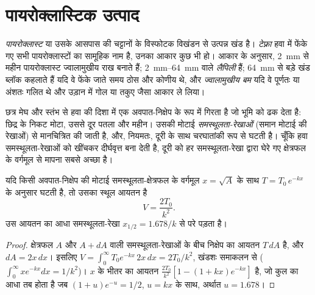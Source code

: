 \section{पायरोक्लास्टिक उत्पाद}

\begin{definition}[टेफ़्रा और पायरोक्लास्ट]\label{def:b2:eruptive-styles:tephra}
\emph{पायरोक्लास्ट}  या उसके आसपास की चट्टानों के विस्फोटक
विखंडन से उत्पन्न खंड है। \emph{टेफ़्रा} हवा में फेंके गए
सभी पायरोक्लास्टों का सामूहिक नाम है, उनका आकार कुछ भी हो।
आकार के अनुसार, \qty{2}{mm} से महीन पायरोक्लास्ट ज्वालामुखीय राख बनाते हैं;
\qtyrange{2}{64}{mm} वाले \emph{लैपिली} हैं;
\qty{64}{mm} से बड़े खंड ब्लॉक कहलाते हैं यदि वे फेंके जाते समय ठोस और कोणीय थे, और
\emph{ज्वालामुखीय बम} यदि वे पूर्णतः या अंशतः गलित थे
और उड़ान में गोल या तकुए जैसा आकार ले लिया।
\end{definition}

 छत्र मेघ और स्तंभ से हवा की दिशा में एक अवपात-निक्षेप के रूप में गिरता है
जो भूमि को ढक देता है: छिद्र के निकट मोटा, उससे दूर पतला और महीन। उसकी
मोटाई \emph{समस्थूलता-रेखाओं} (समान मोटाई की रेखाओं) से मानचित्रित की जाती है, और, नियमतः,
दूरी के साथ चरघातांकी रूप से घटती है। चूँकि हवा समस्थूलता-रेखाओं को खींचकर
दीर्घवृत्त बना देती है, दूरी को हर समस्थूलता-रेखा द्वारा घेरे गए क्षेत्रफल के वर्गमूल से
मापना सबसे अच्छा है।

\begin{proposition}\label{prop:b2:eruptive-styles:thinning}
यदि किसी अवपात-निक्षेप की मोटाई समस्थूलता-क्षेत्रफल के वर्गमूल $x = \sqrt A$ के साथ
$T = T_0\,e^{-kx}$ के अनुसार घटती है, तो उसका स्थूल आयतन है
\[
V = \frac{2T_0}{k^2}.
\]
उस आयतन का आधा समस्थूलता-रेखा $x_{1/2} = 1.678/k$ से परे पड़ता है।
\end{proposition}

\begin{proof}
क्षेत्रफल $A$ और $A + dA$ वाली समस्थूलता-रेखाओं के बीच निक्षेप का आयतन $T\,dA$ है,
और $dA = 2x\,dx$। इसलिए $V = \int_0^\infty T_0e^{-kx}\,2x\,dx = 2T_0/k^2$,
खंडशः समाकलन से ($\int_0^\infty xe^{-kx}dx = 1/k^2$)। $x$ के भीतर का आयतन
$\frac{2T_0}{k^2}[1 - (1 + kx)e^{-kx}]$ है, जो कुल का आधा तब होता है जब $(1 +
u)e^{-u} = 1/2$, $u = kx$ के साथ, अर्थात $u = 1.678$।
\end{proof}


